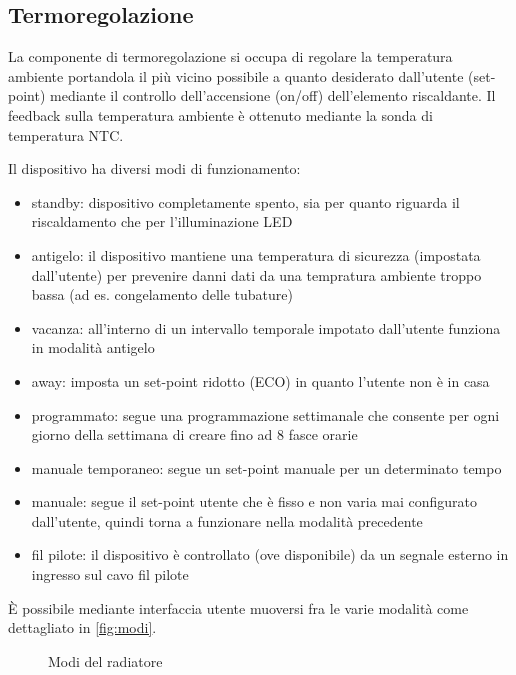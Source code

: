 \documentclass[12pt,a4paper,twoside,titlepage]{book}
\begin{document}
\subsection{Termoregolazione}

La componente di termoregolazione si occupa di regolare la temperatura ambiente portandola
il più vicino possibile a quanto desiderato dall'utente (set-point) mediante
il controllo dell'accensione (on/off) dell'elemento riscaldante. Il feedback sulla
temperatura ambiente è ottenuto mediante la sonda di temperatura NTC.

Il dispositivo ha diversi modi di funzionamento:
\begin{itemize}
    \item standby: dispositivo completamente spento, sia per quanto riguarda il riscaldamento
        che per l'illuminazione LED
    \item antigelo: il dispositivo mantiene una temperatura di sicurezza (impostata dall'utente)
        per prevenire danni dati da una tempratura ambiente troppo bassa (ad es. congelamento delle tubature)
    \item vacanza: all'interno di un intervallo temporale impotato dall'utente funziona
        in modalità antigelo
    \item away: imposta un set-point ridotto (ECO) in quanto l'utente non è in casa
    \item programmato: segue una programmazione settimanale che consente per ogni
        giorno della settimana di creare fino ad 8 fasce orarie
    \item manuale temporaneo: segue un set-point manuale per un determinato tempo
    \item manuale: segue il set-point utente che è fisso e non varia mai
        configurato dall'utente, quindi torna a funzionare nella modalità precedente
    \item fil pilote: il dispositivo è controllato (ove disponibile) da un segnale
        esterno in ingresso sul cavo fil pilote
\end{itemize}

È possibile mediante interfaccia utente muoversi fra le varie modalità come dettagliato
in \autoref{fig:modi}.

\begin{figure}[ht]
    \centering
    \caption{Modi del radiatore}
    \label{fig:modi}
\end{figure}
\end{document}
